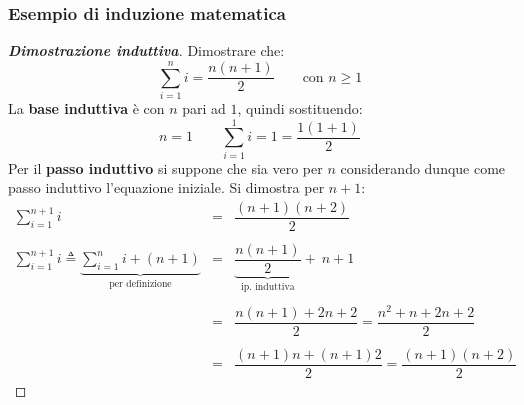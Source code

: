 \documentclass[oneside,a4paper,11pt]{book}
\theoremstyle{italicstyle}
\theoremstyle{normStyle}
\begin{document}
\subsubsection{Esempio di induzione matematica}
\begin{proof}[\textbf{Dimostrazione induttiva}]
  Dimostrare che:
  \begin{equation*}
      \sum_{i = 1}^{n} i = \dfrac{n \left( n + 1 \right)}{2} \hspace{2em} \text{con } n \ge 1
  \end{equation*}
  La \textbf{base induttiva} è con $n$ pari ad $1$, quindi sostituendo:
  \begin{equation*}
      n = 1 \hspace{2em} \sum_{i = 1}^{1} i = 1 = \dfrac{1 \left( 1 + 1 \right)}{2}
  \end{equation*}
  Per il \textbf{passo induttivo} si suppone che sia vero per $n$ considerando dunque come passo induttivo l'equazione iniziale. Si dimostra per $n + 1$:
  \begin{equation*}
      \begin{array}{rll}
          \displaystyle\sum_{i=1}^{n+1} i & = & \dfrac{ \left(n+1\right) \left(n+2\right) }{2} \\
          \\
          \displaystyle\sum_{i=1}^{n+1} i \triangleq \underbrace{\sum_{i=1}^{n} i + \left(n+1\right)}_{\text{per definizione}} & = 
          & \underbrace{\dfrac{n \left(n+1\right)}{2}}_{\text{ip. induttiva}} + \: n + 1 \\
          \\
          & = & \dfrac{n \left(n+1\right) + 2n + 2}{2} = \dfrac{n^{2} + n + 2n + 2}{2} \\
          \\
          & = & \dfrac{\left(n+1\right) n + \left(n+1\right) 2}{2} = \dfrac{\left(n+1\right) \left(n+2\right)}{2}
      \end{array}
  \end{equation*}
\end{proof}
\end{document}
